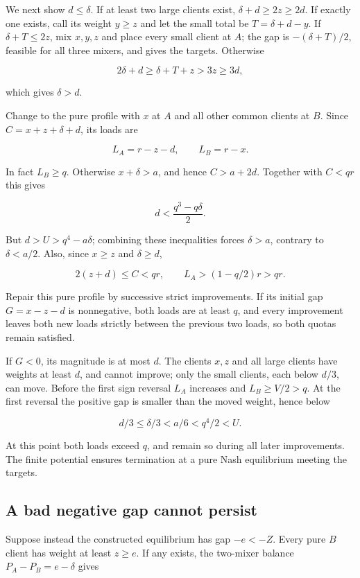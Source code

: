 \documentclass[11pt,a4paper]{article}
\begin{document}
We next show \(d\le\delta\). If at least two large clients exist, \(\delta+d\ge2z\ge2d\). If exactly one exists, call its weight \(y\ge z\) and let the small total be \(T=\delta+d-y\). If \(\delta+T\le2z\), mix \(x,y,z\) and place every small client at \(A\); the gap is \(-(\delta+T)/2\), feasible for all three mixers, and gives the targets. Otherwise

\[
2\delta+d\ge\delta+T+z>3z\ge3d,
\]

which gives \(\delta>d\).

Change to the pure profile with \(x\) at \(A\) and all other common clients at \(B\). Since \(C=x+z+\delta+d\), its loads are

\[
L_A=r-z-d,\qquad L_B=r-x.
\]

In fact \(L_B\ge q\). Otherwise \(x+\delta>a\), and hence \(C>a+2d\). Together with \(C<qr\) this gives

\[
d<\frac{q^3-q\delta}{2}.
\]

But \(d>U>q^4-a\delta\); combining these inequalities forces \(\delta>a\), contrary to \(\delta<a/2\). Also, since \(x\ge z\) and \(\delta\ge d\),

\[
2(z+d)\le C<qr,
\qquad L_A>(1-q/2)r>qr.
\]

Repair this pure profile by successive strict improvements. If its initial gap \(G=x-z-d\) is nonnegative, both loads are at least \(q\), and every improvement leaves both new loads strictly between the previous two loads, so both quotas remain satisfied.

If \(G<0\), its magnitude is at most \(d\). The clients \(x,z\) and all large clients have weights at least \(d\), and cannot improve; only the small clients, each below \(d/3\), can move. Before the first sign reversal \(L_A\) increases and \(L_B\ge V/2>q\). At the first reversal the positive gap is smaller than the moved weight, hence below

\[
d/3\le\delta/3<a/6<q^4/2<U.
\]

At this point both loads exceed \(q\), and remain so during all later improvements. The finite potential ensures termination at a pure Nash equilibrium meeting the targets.

\hypertarget{a-bad-negative-gap-cannot-persist}{%
\subsection{A bad negative gap cannot persist}\label{a-bad-negative-gap-cannot-persist}}

Suppose instead the constructed equilibrium has gap \(-e<-Z\). Every pure \(B\) client has weight at least \(z\ge e\). If any exists, the two-mixer balance \(P_A-P_B=e-\delta\) gives
\end{document}
